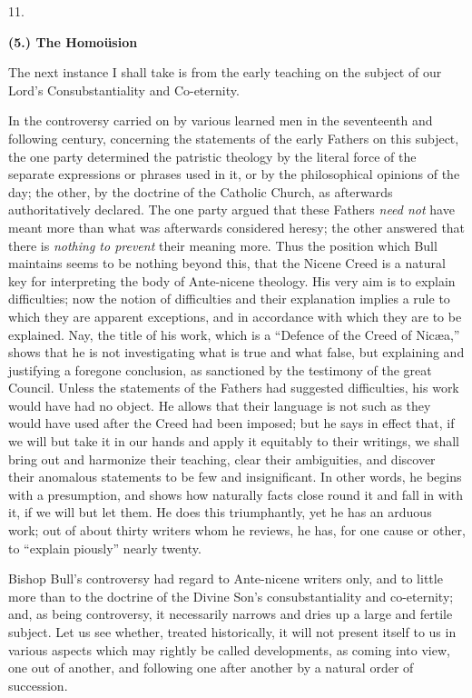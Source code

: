 11.

\textbf{(5.) The Homoüsion}

The next instance I shall take is from the early teaching
on the subject of our Lord's Consubstantiality and
Co-eternity.

In the controversy carried on by various learned men
in the seventeenth and following century, concerning the
statements of the early Fathers on this subject, the one
party determined the patristic theology by the literal
force of the separate expressions or phrases used in it,
or by the philosophical opinions of the day; the other,
by the doctrine of the Catholic Church, as afterwards
authoritatively declared. The one party argued that these
Fathers \emph{ need not} have meant more than what was afterwards
considered heresy; the other answered that there is \emph{nothing
to prevent} their meaning more. Thus the position
which Bull maintains seems to be nothing beyond this,
that the Nicene Creed is a natural key for interpreting
the body of Ante-nicene theology. His very aim is to
explain difficulties; now the notion of difficulties and
their explanation implies a rule to which they are
apparent exceptions, and in accordance with which they
are to be explained. Nay, the title of his work, which is
a ``Defence of the Creed of Nicæa,'' shows that
he is not investigating what is true and what false, but
explaining and justifying a foregone conclusion, as
sanctioned by the testimony of the great Council. Unless
the statements of the Fathers had suggested difficulties,
his work would have had no object. He allows that their
language is not such as they would have used after the
Creed had been imposed; but he says in effect that, if we
will but take it in our hands and apply it equitably to
their writings, we shall bring out and harmonize their
teaching, clear their ambiguities, and discover their
anomalous statements to be few and insignificant. In
other words, he begins with a presumption, and shows how
naturally facts close round it and fall in with it, if we
will but let them. He does this triumphantly, yet he has
an arduous work; out of about thirty writers whom he
reviews, he has, for one cause or other, to ``explain
piously'' nearly twenty.


Bishop Bull's controversy had regard to Ante-nicene
writers only, and to little more than to the doctrine of
the Divine Son's consubstantiality and co-eternity; and,
as being controversy, it necessarily narrows and dries up
a large and fertile subject. Let us see whether, treated
historically, it will not present itself to us in various
aspects which may rightly be called developments, as
coming into view, one out of another, and following one
after another by a natural order of succession.

